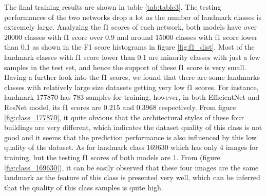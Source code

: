 \documentclass[10pt,twocolumn,letterpaper]{article}
\begin{document}
The final training results are shown in table \ref{tab:table3}. The testing performances of the two networks drop a lot as the number of landmark classes is extremely large. Analyzing the f1 scores of each network, both models have over $20000$ classes with f1 score over 0.9 and around $15000$ classes with f1 score lower than 0.1 as shown in the F1 score histograms in figure \ref{fig:f1_dist}. Most of the landmark classes with f1 score lower than 0.1 are minority classes with just a few samples in the test set, and hence the support of these f1 score is very small. Having a further look into the f1 scores, we found that there are some landmarks classes with relatively large size datasets getting very low f1 scores. For instance, landmark 177870 has $783$ samples for training, however, in both EfficientNet and ResNet model, its f1 scores are $0.215$ and $0.3968$ respectively. From figure \ref{fig:class_177870}, it quite obvious that the architectural styles of these four buildings are very different, which indicates the dataset quality of this class is not good and it seems that the prediction performance is also influenced by this low quality of the dataset. As for landmark class $169630$ which has only 4 images for training, but the testing f1 scores of both models are 1. From (figure \ref{fig:class_169630}), it can be easily observed that these four images are the same landmark as the feature of this class is presented very well, which can be inferred that the quality of this class samples is quite high.
\end{document}
